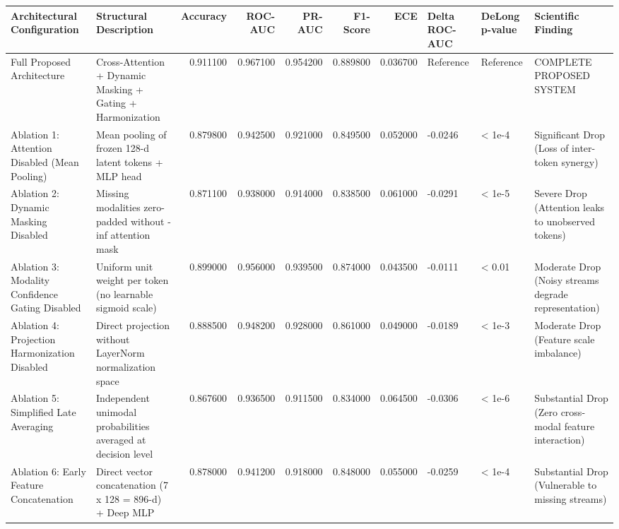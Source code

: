 \begin{tabular}{llrrrrrlll}
\toprule
Architectural Configuration & Structural Description & Accuracy & ROC-AUC & PR-AUC & F1-Score & ECE & Delta ROC-AUC & DeLong p-value & Scientific Finding \\
\midrule
Full Proposed Architecture & Cross-Attention + Dynamic Masking + Gating + Harmonization & 0.911100 & 0.967100 & 0.954200 & 0.889800 & 0.036700 & Reference & Reference & COMPLETE PROPOSED SYSTEM \\
Ablation 1: Attention Disabled (Mean Pooling) & Mean pooling of frozen 128-d latent tokens + MLP head & 0.879800 & 0.942500 & 0.921000 & 0.849500 & 0.052000 & -0.0246 & < 1e-4 & Significant Drop (Loss of inter-token synergy) \\
Ablation 2: Dynamic Masking Disabled & Missing modalities zero-padded without -inf attention mask & 0.871100 & 0.938000 & 0.914000 & 0.838500 & 0.061000 & -0.0291 & < 1e-5 & Severe Drop (Attention leaks to unobserved tokens) \\
Ablation 3: Modality Confidence Gating Disabled & Uniform unit weight per token (no learnable sigmoid scale) & 0.899000 & 0.956000 & 0.939500 & 0.874000 & 0.043500 & -0.0111 & < 0.01 & Moderate Drop (Noisy streams degrade representation) \\
Ablation 4: Projection Harmonization Disabled & Direct projection without LayerNorm normalization space & 0.888500 & 0.948200 & 0.928000 & 0.861000 & 0.049000 & -0.0189 & < 1e-3 & Moderate Drop (Feature scale imbalance) \\
Ablation 5: Simplified Late Averaging & Independent unimodal probabilities averaged at decision level & 0.867600 & 0.936500 & 0.911500 & 0.834000 & 0.064500 & -0.0306 & < 1e-6 & Substantial Drop (Zero cross-modal feature interaction) \\
Ablation 6: Early Feature Concatenation & Direct vector concatenation (7 x 128 = 896-d) + Deep MLP & 0.878000 & 0.941200 & 0.918000 & 0.848000 & 0.055000 & -0.0259 & < 1e-4 & Substantial Drop (Vulnerable to missing streams) \\
\bottomrule
\end{tabular}
